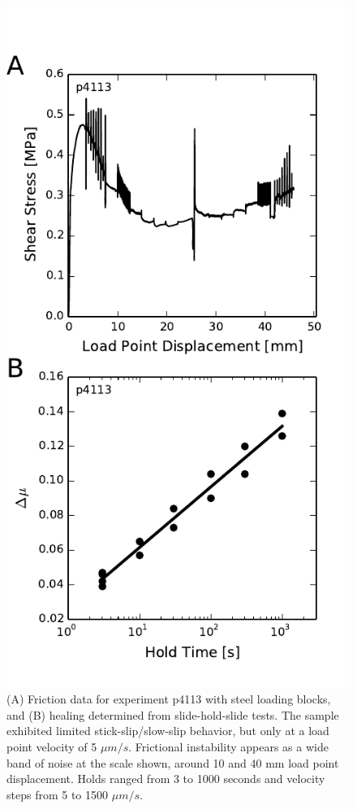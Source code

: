 \begin{figure}
\begin{centering}
\includegraphics{chap_granular_stiffness/Fig7.pdf}
\caption{\label{fig:healing_p4113}
(A) Friction data for experiment p4113 with steel loading blocks, and (B) healing determined from slide-hold-slide tests. The sample exhibited limited stick-slip/slow-slip behavior, but only at a load point velocity of 5 $\mu m/s$.  Frictional instability appears as a wide band of noise at the scale shown, around 10 and 40 mm load point displacement. Holds ranged from 3 to 1000 seconds and velocity steps from 5 to 1500 $\mu m/s$.}
\end{centering}
\end{figure}



